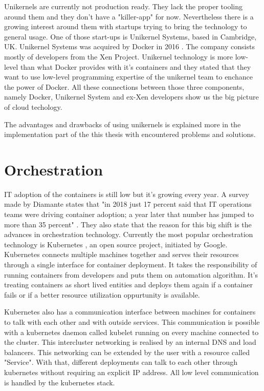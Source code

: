 Unikernels are currently not production ready. \cite{unfit-for-production} They lack the proper tooling around them and they don't have a "killer-app" for now. Nevertheless there is a growing interest around them with startups trying to bring the technology to general usage. One of those start-ups is Unikernel Systems, based in Cambridge, UK. Unikernel Systems was acquired by Docker in 2016 \cite{docker-acquisiton}. The company consists mostly of developers from the Xen Project. Unikernel technology is more low-level than what Docker provides with it's containers and they stated that they want to use low-level programming expertise of the unikernel team to enchance the power of Docker. All these connections between those three components, namely Docker, Unikernel System and ex-Xen developers show us the big picture of cloud techology.

The advantages and drawbacks of using unikernels is explained more in the implementation part of the this thesis with encountered problems and solutions.

\section{Orchestration}
IT adoption of the containers is still low but it's growing every year. A survey made by Diamante states that "in 2018 just 17 percent said that IT operations teams were driving container adoption; a year later that number has jumped to more than 35 percent" \cite{diamante}. They also state that the reason for this big shift is the advances in orchestration technology. Currently the most popular orchestration technology is Kubernetes , an open source project, initiated by Google. Kubernetes connects multiple machines together and serves their resources through a single interface for container deployment. It takes the responsibility of running containers from developers and puts them on automation algorithm. It's treating containers as short lived entities and deploys them again if a container fails or if a better resource utilization oppurtunity is available.

Kubernetes also has a communication interface between machines for containers to talk with each other and with outside services. This communication is possible with a kubernetes daemon called kubelet running on every machine connected to the cluster. This intercluster networking is realised by an internal DNS and load balancers. This networking can be extended by the user with a resource called "Service". With that, different deployments can talk to each other through kubernetes without requiring an explicit IP address. All low level communication is handled by the kubernetes stack. 

